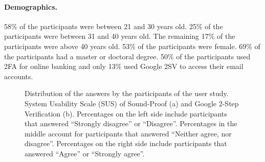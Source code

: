 \paragraph{Demographics.}
58\% of the participants were between 21 and 30 years old.
25\% of the participants were between 31 and 40 years old.
The remaining 17\% of the participants were above 40 years old.
53\% of the participants were female.
69\% of the participants had a master or doctoral degree.
50\% of the participants used 2FA for online banking and only 13\% used Google 2SV to access their email accounts.

\begin{figure}[!ht]
\centering
{}

\caption[Distribution of the answers by the participants of the user study]{Distribution
of the answers by the participants of the user study. System Usability Scale (SUS) of
Sound-Proof (a) and Google 2-Step Verification (b). Percentages on the left side include
participants that answered ``Strongly disagree'' or ``Disagree''. Percentages in the
middle account for participants that answered ``Neither agree, nor disagree''.
Percentages on the right side include participants that answered ``Agree'' or ``Strongly
agree''.}
\label{fig:ps_sp_likerts}
\end{figure}

